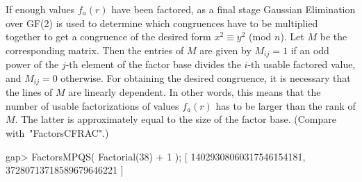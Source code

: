 If enough values $f_a(r)$ have been factored, as a final stage
Gaussian Elimination over GF(2) is used to determine which
congruences have to be multiplied together to get a congruence
of the desired form $x^2 \equiv y^2$ (mod $n$).
Let $M$ be the corresponding matrix. Then the entries of $M$ are given
by $M_{ij} = 1$ if an odd power of the $j$-th element of the factor
base divides the $i$-th usable factored value, and $M_{ij} = 0$
otherwise.
For obtaining the desired congruence, it is necessary that the lines
of $M$ are linearly dependent.
In other words, this means that the number of usable factorizations of
values $f_a(r)$ has to be larger than the rank of $M$.
The latter is approximately equal to the size of the factor base.
(Compare with~"FactorsCFRAC".)

\beginexample
gap> FactorsMPQS( Factorial(38) + 1 );
[ 14029308060317546154181, 37280713718589679646221 ]
\endexample


